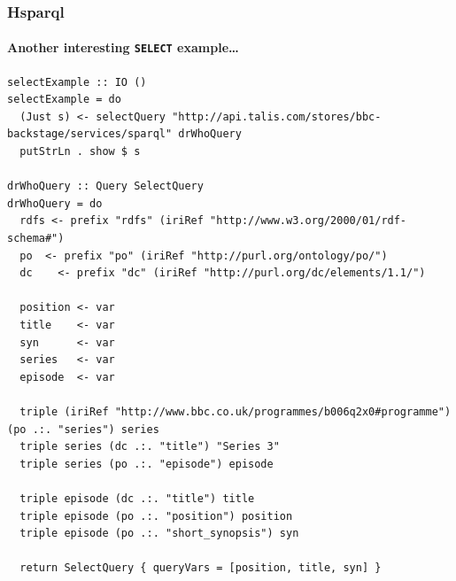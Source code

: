 \documentclass{beamer}
\begin{document}
\begin{frame}[fragile]
\frametitle{Hsparql}
\framesubtitle{Another interesting \texttt{SELECT} example\ldots}

\tiny
\begin{verbatim}
selectExample :: IO ()
selectExample = do
  (Just s) <- selectQuery "http://api.talis.com/stores/bbc-backstage/services/sparql" drWhoQuery
  putStrLn . show $ s

drWhoQuery :: Query SelectQuery
drWhoQuery = do
  rdfs <- prefix "rdfs" (iriRef "http://www.w3.org/2000/01/rdf-schema#")
  po  <- prefix "po" (iriRef "http://purl.org/ontology/po/")
  dc    <- prefix "dc" (iriRef "http://purl.org/dc/elements/1.1/")

  position <- var
  title    <- var
  syn      <- var
  series   <- var
  episode  <- var

  triple (iriRef "http://www.bbc.co.uk/programmes/b006q2x0#programme") (po .:. "series") series
  triple series (dc .:. "title") "Series 3"
  triple series (po .:. "episode") episode

  triple episode (dc .:. "title") title
  triple episode (po .:. "position") position
  triple episode (po .:. "short_synopsis") syn

  return SelectQuery { queryVars = [position, title, syn] }
\end{verbatim}

\end{frame}
\end{document}
